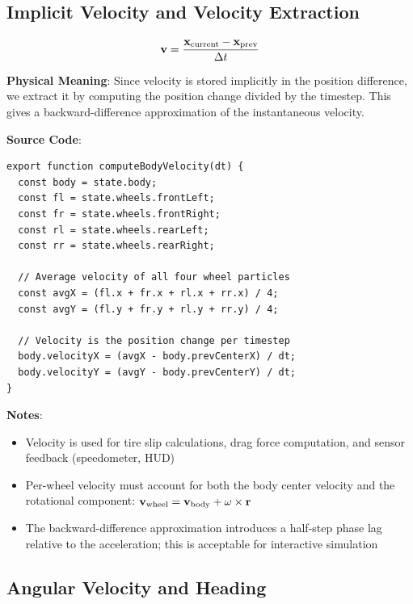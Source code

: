 \subsection{Implicit Velocity and Velocity Extraction}

\begin{equation}
  \mathbf{v} = \frac{\mathbf{x}_{\text{current}} - \mathbf{x}_{\text{prev}}}{\Delta t}
  \label{eq:velocity-extraction}
\end{equation}

\textbf{Physical Meaning}: Since velocity is stored implicitly in the position difference, we extract it by computing the position change divided by the timestep. This gives a backward-difference approximation of the instantaneous velocity.

\textbf{Source Code}: 

\begin{lstlisting}[caption={Velocity computation from position differences}]
export function computeBodyVelocity(dt) {
  const body = state.body;
  const fl = state.wheels.frontLeft;
  const fr = state.wheels.frontRight;
  const rl = state.wheels.rearLeft;
  const rr = state.wheels.rearRight;

  // Average velocity of all four wheel particles
  const avgX = (fl.x + fr.x + rl.x + rr.x) / 4;
  const avgY = (fl.y + fr.y + rl.y + rr.y) / 4;

  // Velocity is the position change per timestep
  body.velocityX = (avgX - body.prevCenterX) / dt;
  body.velocityY = (avgY - body.prevCenterY) / dt;
}
\end{lstlisting}

\textbf{Notes}:
\begin{itemize}
  \item Velocity is used for tire slip calculations, drag force computation, and sensor feedback (speedometer, HUD)
  \item Per-wheel velocity must account for both the body center velocity and the rotational component: $\mathbf{v}_{\text{wheel}} = \mathbf{v}_{\text{body}} + \omega \times \mathbf{r}$
  \item The backward-difference approximation introduces a half-step phase lag relative to the acceleration; this is acceptable for interactive simulation
\end{itemize}

\subsection{Angular Velocity and Heading}


